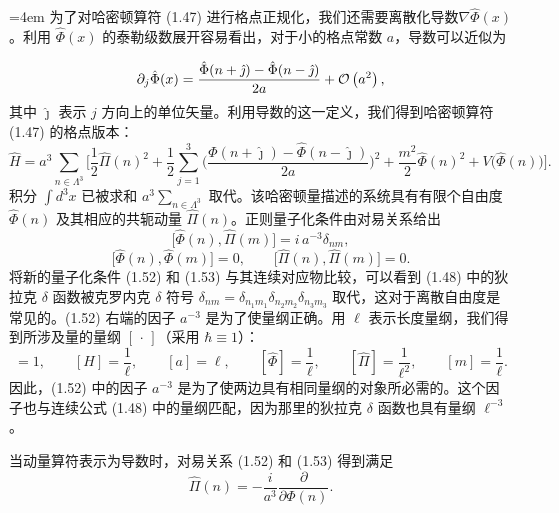 \begingroup\emergencystretch=4em 为了对哈密顿算符 (1.47) 进行格点正规化，我们还需要离散化导数\linebreak[0] $\nabla\hat{\Phi}(x)$。利用 $\hat{\Phi}(x)$ 的泰勒级数展开容易看出，对于小的格点常数 $a$，导数可以近似为\par\endgroup
\begin{equation}
  \partial_j\hat{\Phi}(x)
  = \frac{\hat{\Phi}(n+\hat{\jmath}) - \hat{\Phi}(n-\hat{\jmath})}{2a}
    + \mathcal{O}\left(a^2\right),
\end{equation}
其中 $\hat{\jmath}$ 表示 $j$ 方向上的单位矢量。利用导数的这一定义，我们得到哈密顿算符 (1.47) 的格点版本：
\begin{equation}
  \hat{H} = a^3\sum_{n\in\Lambda^3}\Big[
    \frac{1}{2}\hat{\Pi}(n)^2
    + \frac{1}{2}\sum_{j=1}^3
      \Big(\frac{\hat{\Phi}(n+\hat{\jmath}) - \hat{\Phi}(n-\hat{\jmath})}{2a}\Big)^2
    + \frac{m^2}{2}\hat{\Phi}(n)^2 + V\big(\hat{\Phi}(n)\big)\Big].
\end{equation}
积分 $\int d^3x$ 已被求和 $a^3\sum_{n\in\Lambda^3}$ 取代。该哈密顿量描述的系统具有有限个自由度 $\hat{\Phi}(n)$ 及其相应的共轭动量 $\hat{\Pi}(n)$。正则量子化条件由对易关系给出
\begin{equation}
  \big[\hat{\Phi}(n), \hat{\Pi}(m)\big] = i\,a^{-3}\delta_{nm},
\end{equation}
\begin{equation}
  \big[\hat{\Phi}(n), \hat{\Phi}(m)\big] = 0, \qquad
  \big[\hat{\Pi}(n), \hat{\Pi}(m)\big] = 0.
\end{equation}
将新的量子化条件 (1.52) 和 (1.53) 与其连续对应物比较，可以看到 (1.48) 中的狄拉克 $\delta$ 函数被克罗内克 $\delta$ 符号 $\delta_{nm} = \delta_{n_1 m_1}\delta_{n_2 m_2}\delta_{n_3 m_3}$ 取代，这对于离散自由度是常见的。(1.52) 右端的因子 $a^{-3}$ 是为了使量纲正确。用 $\ell$ 表示长度量纲，我们得到所涉及量的量纲 $[\,\cdot\,]$（采用 $\hbar \equiv 1$）：
\begin{equation}
  [S] = 1, \qquad [H] = \frac{1}{\ell}, \qquad [a] = \ell, \qquad
  [\hat{\Phi}] = \frac{1}{\ell}, \qquad [\hat{\Pi}] = \frac{1}{\ell^2}, \qquad
  [m] = \frac{1}{\ell}.
\end{equation}
因此，(1.52) 中的因子 $a^{-3}$ 是为了使两边具有相同量纲的对象所必需的。这个因子也与连续公式 (1.48) 中的量纲匹配，因为那里的狄拉克 $\delta$ 函数也具有量纲 $\ell^{-3}$。

当动量算符表示为导数时，对易关系 (1.52) 和 (1.53) 得到满足
\begin{equation}
  \hat{\Pi}(n) = -\frac{i}{a^3}\frac{\partial}{\partial\Phi(n)}.
\end{equation}

